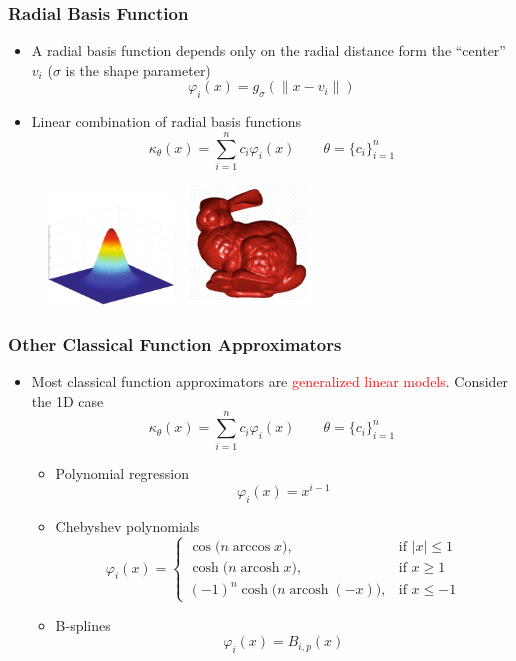 \documentclass{beamer}
\newcommand{\red}[1]{\textcolor{red}{#1}}
\begin{document}
\begin{frame}
\frametitle{Radial Basis Function}
\begin{itemize}
	\item A radial basis function depends only on the radial distance form the ``center'' $v_i$ ($\sigma$ is the shape parameter)
	$$\varphi_i(x) = g_{\sigma}(\|x-v_i\|)$$
	\item Linear combination of radial basis functions
	\begin{equation*}
		\kappa_{\theta}(x) = \sum_{i=1}^n c_i\varphi_i(x)\qquad \theta = \{c_i\}_{i=1}^n
	\end{equation*}
\end{itemize}
\begin{figure}[hbt]
  \includegraphics[width=0.3\textwidth]{figures/rbf}~
  \includegraphics[width=0.3\textwidth]{figures/rbfapp}
\end{figure}

\end{frame}


\begin{frame}
\frametitle{Other Classical Function Approximators}

\begin{itemize}
	\item Most classical function approximators are \red{generalized linear models}. Consider the 1D case
	\begin{equation*}
		\kappa_{\theta}(x) = \sum_{i=1}^n c_i\varphi_i(x)\qquad \theta = \{c_i\}_{i=1}^n
	\end{equation*}
	
	\begin{itemize}
	\item Polynomial regression 
	$$\varphi_i(x) = x^{i-1} $$
	\item Chebyshev polynomials
	$$\varphi_i(x) = \begin{cases}
\cos\big(n \arccos x \big), & \text{if }|x| \le 1 \\
\cosh\big(n \operatorname{arcosh} x \big), & \text{if }x \ge 1 \\ 
(-1)^n \cosh\big(n \operatorname{arcosh} (-x) \big), & \text{if }x \le -1  
\end{cases}$$
\item B-splines
$$\varphi_i(x) = B_{i,p}(x)$$
	\end{itemize}
\end{itemize}
\end{frame}
\end{document}
